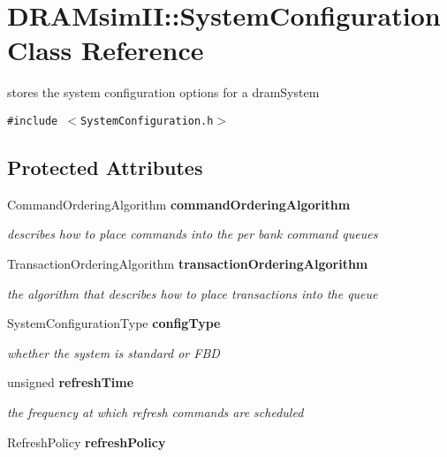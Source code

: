\section{DRAMsimII::SystemConfiguration Class Reference}
\label{class_d_r_a_msim_i_i_1_1_system_configuration}
stores the system configuration options for a dramSystem  


{\tt \#include $<$SystemConfiguration.h$>$}

\subsection*{Protected Attributes}
\begin{CompactItemize}
\item 
CommandOrderingAlgorithm {\bf commandOrderingAlgorithm}\label{class_d_r_a_msim_i_i_1_1_system_configuration_86c48c5a61c66a2529da7ee18cfbdcf4}

\begin{CompactList}\small\item\em describes how to place commands into the per bank command queues \item\end{CompactList}\item 
TransactionOrderingAlgorithm {\bf transactionOrderingAlgorithm}\label{class_d_r_a_msim_i_i_1_1_system_configuration_2e2639a70d39978c115d08854824ec05}

\begin{CompactList}\small\item\em the algorithm that describes how to place transactions into the queue \item\end{CompactList}\item 
SystemConfigurationType {\bf configType}\label{class_d_r_a_msim_i_i_1_1_system_configuration_2bc2412d43c18091191c64267a6b1a78}

\begin{CompactList}\small\item\em whether the system is standard or FBD \item\end{CompactList}\item 
unsigned {\bf refreshTime}\label{class_d_r_a_msim_i_i_1_1_system_configuration_332e207779eaf2f92bfaf4826faf9ea8}

\begin{CompactList}\small\item\em the frequency at which refresh commands are scheduled \item\end{CompactList}\item 
RefreshPolicy {\bf refreshPolicy}\label{class_d_r_a_msim_i_i_1_1_system_configuration_8f107a8becebbee1c6f792297cdc2020}


\end{CompactItemize}
